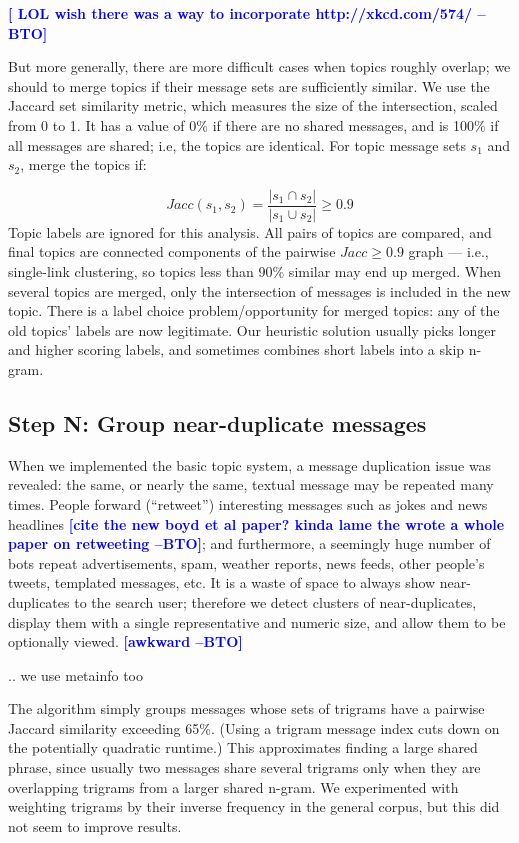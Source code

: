 \documentclass[letterpaper]{article}
\newcommand{\bto}[1]{\textcolor{blue}{\textbf{[#1 --BTO]}}}
\newcommand{\codenote}[1]{}
\begin{document}
\bto{ LOL wish there was a way to incorporate http://xkcd.com/574/ }

But more generally, there are more difficult cases when topics roughly overlap; we should to merge topics if their message sets are sufficiently similar.  We use the Jaccard set similarity metric, which measures the size of the intersection, scaled from 0 to 1.  It has a value of 0\% if there are no shared messages, and is 100\% if all messages are shared; i.e, the topics are identical.  For topic message sets $s_1$ and $s_2$, merge the topics if:

\[ Jacc(s_1,s_2) = \frac{ |s_1 \cap s_2| }{ |s_1 \cup s_2 | } \geq 0.9 
\]
Topic labels are ignored for this analysis.  All pairs of topics are compared, and final topics are connected components of the pairwise $Jacc \geq 0.9$ graph --- i.e., single-link clustering, so topics less than 90\% similar may end up merged.  When several topics are merged, only the intersection of messages is included in the new topic.  There is a label choice problem/opportunity for merged topics: any of the old topics' labels are now legitimate.  Our heuristic solution usually picks longer and higher scoring labels, and sometimes combines short labels into a skip n-gram.

\subsection{Step N: Group near-duplicate messages}

\codenote{ deduper.py }
When we implemented the basic topic system, a message duplication issue was revealed: the same, or nearly the same, textual message may be repeated many times.  People forward (``retweet'') interesting messages such as jokes and news headlines \bto{cite the new boyd et al paper?  kinda lame the wrote a whole paper on retweeting}; and furthermore, a seemingly huge number of bots repeat advertisements, spam, weather reports, news feeds, other people's tweets, templated messages, etc.  It is a waste of space to always show near-duplicates to the search user; therefore we detect clusters of near-duplicates, display them with a single representative and numeric size, and allow them to be optionally viewed.  \bto{awkward}

.. we use metainfo too

The algorithm simply groups messages whose sets of trigrams have a pairwise Jaccard similarity exceeding 65\%.  (Using a trigram message index cuts down on the potentially quadratic runtime.)  This approximates finding a large shared phrase, since usually two messages share several trigrams only when they are overlapping trigrams from a larger shared n-gram.  We experimented with weighting trigrams by their inverse frequency in the general corpus, but this did not seem to improve results.   
\end{document}

